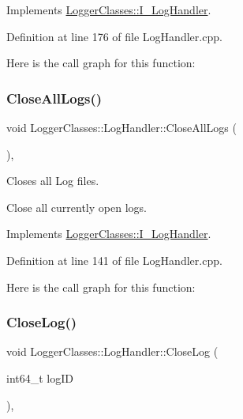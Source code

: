 Implements \mbox{\hyperlink{classLoggerClasses_1_1I__LogHandler_aa9db5e8d4bcd800663bb4dc08cbdda14}{Logger\+Classes\+::\+I\+\_\+\+Log\+Handler}}.



Definition at line 176 of file Log\+Handler.\+cpp.

Here is the call graph for this function\+:
\mbox{\label{classLoggerClasses_1_1LogHandler_a38dcaa7d1bcbfdd9b05483ea86657e6b}} 
\subsubsection{\texorpdfstring{CloseAllLogs()}{CloseAllLogs()}}
{\footnotesize\ttfamily void Logger\+Classes\+::\+Log\+Handler\+::\+Close\+All\+Logs (\begin{DoxyParamCaption}{ }\end{DoxyParamCaption})\hspace{0.3cm}{\ttfamily [override]}, {\ttfamily [virtual]}}



Closes all Log files. 

Close all currently open logs. 

Implements \mbox{\hyperlink{classLoggerClasses_1_1I__LogHandler_a297dc04793c0640700860d36e70bc718}{Logger\+Classes\+::\+I\+\_\+\+Log\+Handler}}.



Definition at line 141 of file Log\+Handler.\+cpp.

Here is the call graph for this function\+:
\mbox{\label{classLoggerClasses_1_1LogHandler_a23f7c4a588bc16e6432ae59071f5d847}} 
\subsubsection{\texorpdfstring{CloseLog()}{CloseLog()}\hspace{0.1cm}{\footnotesize\ttfamily [1/2]}}
{\footnotesize\ttfamily void Logger\+Classes\+::\+Log\+Handler\+::\+Close\+Log (\begin{DoxyParamCaption}\item[{int64\+\_\+t}]{log\+ID }\end{DoxyParamCaption})\hspace{0.3cm}{\ttfamily [override]}, {\ttfamily [virtual]}}



